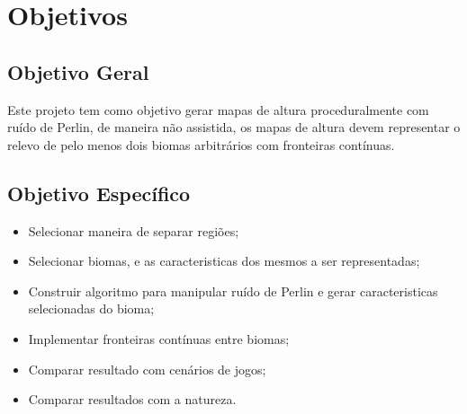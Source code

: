 \chapter{Objetivos}

\section{Objetivo Geral}
Este projeto tem como objetivo gerar mapas de altura proceduralmente com ruído 
de Perlin, de maneira não assistida, os mapas de altura devem representar o 
relevo de pelo menos dois biomas arbitrários com fronteiras contínuas.


\section{Objetivo Específico}

\begin{itemize}
    \item Selecionar maneira de separar regiões;
    \item Selecionar biomas, e as caracteristicas dos mesmos a ser representadas;
    \item Construir algoritmo para manipular ruído de Perlin e gerar caracteristicas
        selecionadas do bioma;
    \item Implementar fronteiras contínuas entre biomas;
    \item Comparar resultado com cenários de jogos;
    \item Comparar resultados com a natureza.
  \end{itemize}





